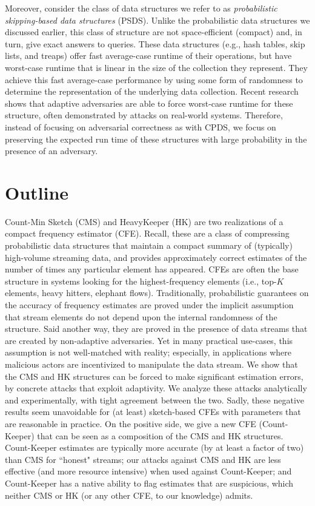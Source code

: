Moreover, consider the class of data structures we refer to as \emph{probabilistic skipping-based data structures} (PSDS). Unlike the probabilistic data structures we discussed earlier, this class of structure are not space-efficient (compact) and, in turn, give exact answers to queries. These data structures (e.g., hash tables, skip lists, and treaps) offer fast average-case runtime of their operations, but have worst-case runtime that is linear in the size of the collection they represent. They achieve this fast average-case performance by using some form of randomness to determine the representation of the underlying data collection.  Recent research shows that adaptive adversaries are able to force worst-case runtime for these structure, often demonstrated by attacks on real-world systems. Therefore, instead of focusing on adversarial correctness as with CPDS, we focus on preserving the expected run time of these structures with large probability in the presence of an adversary.

\section{Outline}

Count-Min Sketch (CMS) and HeavyKeeper (HK) are two realizations of a compact frequency estimator (CFE).  Recall, these are a class of compressing probabilistic data structures that maintain a compact summary of (typically) high-volume streaming data, and provides approximately correct estimates of the number of times any particular element has appeared. CFEs are often the base structure in systems looking for the highest-frequency elements (i.e., top-$K$ elements, heavy hitters, elephant flows).  Traditionally, probabilistic guarantees on the accuracy of frequency estimates are proved under the implicit assumption that stream elements do not depend upon the internal randomness of the structure. Said another way, they are proved in the presence of data streams that are created by non-adaptive adversaries.  Yet in many practical use-cases, this assumption is not well-matched with reality; especially, in applications where malicious actors are incentivized to manipulate the data stream.  We show that the CMS and HK structures can be forced to make significant estimation errors, by concrete attacks that exploit adaptivity.  We analyze these attacks analytically and experimentally, with tight agreement between the two.  Sadly, these negative results seem unavoidable for (at least) sketch-based CFEs with parameters that are reasonable in practice. On the positive side, we give a new CFE (Count-Keeper) that can be seen as a composition of the CMS and HK structures. Count-Keeper estimates are typically more accurate (by at least a factor of two) than CMS for ``honest" streams; our attacks against CMS and HK are less effective (and more resource intensive) when used against Count-Keeper; and Count-Keeper has a native ability to flag estimates that are suspicious, which neither CMS or HK (or any other CFE, to our knowledge) admits.
